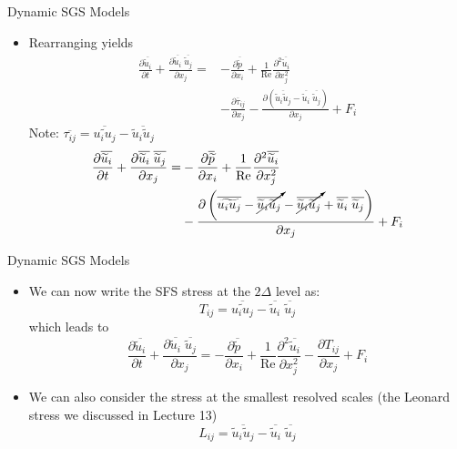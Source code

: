 \begin{frame}{Dynamic SGS Models}
\begin{itemize}
	\item Rearranging yields
	\begin{align*}
	\frac{\partial \overline{\widetilde{u}_i}}{\partial t} + \frac{\partial \overline{\widetilde{u}_i}\;\overline{\widetilde{u}_j}}{\partial x_j} = &- \frac{\partial \overline{\widetilde{p}}}{\partial x_i} + \frac{1}{\text{Re}}\frac{\partial^2\overline{\widetilde{u}_i}}{\partial x_j^2}\\&- \frac{\partial \overline{\tau}_{ij}}{\partial x_j} - \frac{\partial \left(\overline{\widetilde{u}_i \widetilde{u}_j} - \overline{\widetilde{u}_i}\; \overline{\widetilde{u}_j}\right)}{\partial x_j}+ F_i
	\end{align*}
	Note: $\overline{\tau_{ij}} = \overline{\widetilde{u_i u_j}} - \overline{\widetilde{u}_i\widetilde{u}_j}$
	\begin{align*}
	\frac{\partial \overline{\widetilde{u}_i}}{\partial t} + \frac{\partial \overline{\widetilde{u}_i}\;\overline{\widetilde{u}_j}}{\partial x_j} = &- \frac{\partial \overline{\widetilde{p}}}{\partial x_i} + \frac{1}{\text{Re}}\frac{\partial^2\overline{\widetilde{u}_i}}{\partial x_j^2}\\&- \frac{\partial \left( \overline{\widetilde{u_i u_j}} - \cancelto{}{\overline{\widetilde{u}_i\widetilde{u}_j}}- \cancelto{}{\overline{\widetilde{u}_i \widetilde{u}_j}} + \overline{\widetilde{u}_i}\; \overline{\widetilde{u}_j}\right)}{\partial x_j}+ F_i
	\end{align*}
\end{itemize}

\end{frame}

\begin{frame}{Dynamic SGS Models}
\begin{itemize}
	\item We can now write the SFS stress at the $2\Delta$ level as:
	\begin{equation}
	\label{sfs2}
	\boxed{T_{ij} = \overline{\widetilde{u_i u_j}} - \overline{\widetilde{u}_i}\; \overline{\widetilde{u}_j}}
	\end{equation}
	which leads to 
	$$\frac{\partial \overline{\widetilde{u}_i}}{\partial t} + \frac{\partial \overline{\widetilde{u}_i}\;\overline{\widetilde{u}_j}}{\partial x_j} = - \frac{\partial \overline{\widetilde{p}}}{\partial x_i} + \frac{1}{\text{Re}}\frac{\partial^2\overline{\widetilde{u}_i}}{\partial x_j^2}- \frac{\partial T_{ij}}{\partial x_j}+ F_i$$
	\item  We can also consider the stress at the smallest resolved scales (the Leonard stress we
discussed in Lecture 13)
	\begin{equation}
	\label{sfs3}
	\boxed{L_{ij} = \overline{\widetilde{u}_i\widetilde{u}_j} - \overline{\widetilde{u}_i}\;\overline{\widetilde{u}_j}}
	\end{equation}
\end{itemize}

\end{frame}

